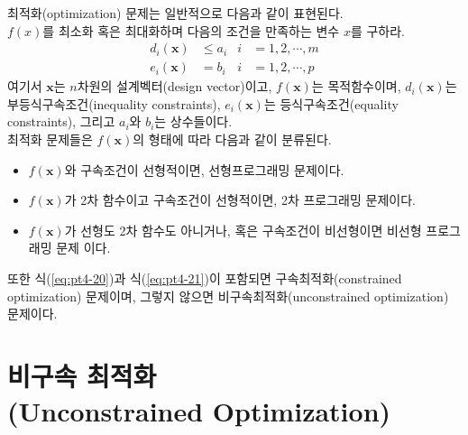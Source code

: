 최적화(optimization) 문제는 일반적으로 다음과 같이 표현된다.\\
$f(x)$를 최소화 혹은 최대화하며 다음의 조건을 만족하는 변수 $x$를 구하라.
\begin{align}
d_{i}(\mathbf{x})&\leq a_{i}&i&=1,2,\cdots,m\label{eq:pt4-20}\\
e_{i}(\mathbf{x})&=b_{i}&i&=1,2,\cdots,p\label{eq:pt4-21}
\end{align}
여기서 $\mathbf{x}$는 $n$차원의 설계벡터(design vector)이고, $f(\mathbf{x})$는 목적함수이며, $d_{i}(\mathbf{x})$는 부등식구속조건(inequality constraints), $e_{i}(\mathbf{x})$는 등식구속조건(equality constraints), 그리고 $a_{i}$와 $b_{i}$는 상수들이다.\\
최적화 문제들은 $f(\mathbf{x})$의 형태에 따라 다음과 같이 분류된다.
\begin{itemize}
\item $f(\mathbf{x})$와 구속조건이 선형적이면, 선형프로그래밍 문제이다.
\item $f(\mathbf{x})$가 2차 함수이고 구속조건이 선형적이면, 2차 프로그래밍 문제이다.
\item $f(\mathbf{x})$가 선형도 2차 함수도 아니거나, 혹은 구속조건이 비선형이면 비선형 프로그래밍 문제 이다.
\end{itemize}
또한 식(\ref{eq:pt4-20})과 식(\ref{eq:pt4-21})이 포함되면 구속최적화(constrained optimization) 문제이며, 그렇지 않으면 비구속최적화(unconstrained optimization) 문제이다.

\section{비구속 최적화\\(Unconstrained Optimization)}
